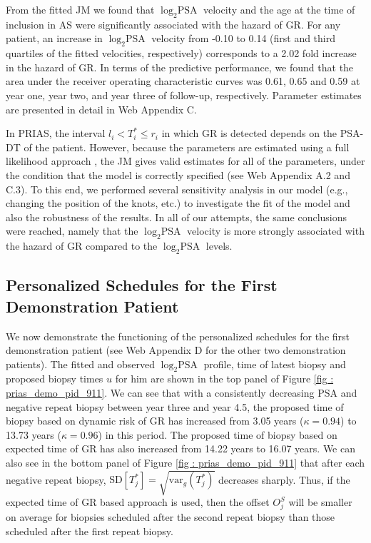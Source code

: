 From the fitted JM we found that $\log_2 \mbox{PSA}$ velocity and the age at the time of inclusion in AS were significantly associated with the hazard of GR. For any patient, an increase in $\log_2 \mbox{PSA}$ velocity from -0.10 to 0.14 (first and third quartiles of the fitted velocities, respectively) corresponds to a 2.02 fold increase in the hazard of GR. In terms of the predictive performance, we found that the area under the receiver operating characteristic curves \citep{landmarking2017} was 0.61, 0.65 and 0.59 at year one, year two, and year three of follow-up, respectively. Parameter estimates are presented in detail in Web Appendix C.

In PRIAS, the interval $l_i < T_i^* \leq r_i$ in which GR is detected depends on the PSA-DT of the patient. However, because the parameters are estimated using a full likelihood approach \citep{tsiatis2004joint}, the JM gives valid estimates for all of the parameters, under the condition that the model is correctly specified (see Web Appendix A.2 and C.3). To this end, we performed several sensitivity analysis in our model (e.g., changing the position of the knots, etc.) to investigate the fit of the model and also the robustness of the results. In all of our attempts, the same conclusions were reached, namely that the $\log_2 \mbox{PSA}$ velocity is more strongly associated with the hazard of GR compared to the $\log_2 \mbox{PSA}$ levels.

\subsection{Personalized Schedules for the First Demonstration Patient}
\label{subsec : demo_prias_pers_schedule}
We now demonstrate the functioning of the personalized schedules for the first demonstration patient (see Web Appendix D for the other two demonstration patients). The fitted and observed $\log_2 \mbox{PSA}$ profile, time of latest biopsy and proposed biopsy times $u$ for him are shown in the top panel of Figure \ref{fig : prias_demo_pid_911}. We can see that with a consistently decreasing PSA and negative repeat biopsy between year three and year 4.5, the proposed time of biopsy based on dynamic risk of GR has increased from 3.05 years ($\kappa=0.94$) to 13.73 years ($\kappa=0.96$) in this period. The proposed time of biopsy based on expected time of GR has also increased from 14.22 years to 16.07 years. We can also see in the bottom panel of Figure \ref{fig : prias_demo_pid_911} that after each negative repeat biopsy, $\mbox{SD}[T^*_j] = \sqrt{\mbox{var}_g(T^*_j)}$ decreases sharply. Thus, if the expected time of GR based approach is used, then the offset $O^S_j$ will be smaller on average for biopsies scheduled after the second repeat biopsy than those scheduled after the first repeat biopsy.

